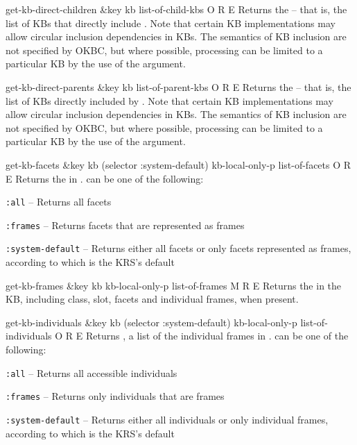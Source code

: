 \begin{okbcop}{get-kb-direct-children}{ \&key kb} { list-of-child-kbs } { O } { R } { E }
Returns the  -- that is, the list of KBs that
    directly include .  Note that certain KB implementations may
    allow circular inclusion dependencies in KBs.  The semantics of KB
    inclusion are not specified by OKBC, but where possible, processing can
    be limited to a particular KB by the use of the 
    argument.
\end{okbcop}

\begin{okbcop}{get-kb-direct-parents}{ \&key kb} { list-of-parent-kbs } { O } { R } { E }
Returns the  -- that is, the list of KBs directly
    included by .  Note that certain KB implementations may allow
    circular inclusion dependencies in KBs.  The semantics of KB inclusion
    are not specified by OKBC, but where possible, processing can be limited
    to a particular KB by the use of the  argument.
\end{okbcop}

\begin{okbcop}{get-kb-facets}{ \&key kb (selector :system-default) kb-local-only-p} { list-of-facets } { O } { R } { E }
Returns the  in .
    can be one of the following:
   \bitem
   \item {\tt :all} -- Returns all facets
   \item {\tt :frames} -- Returns facets that are represented as frames
   \item {\tt :system-default} -- Returns either all facets or
          only facets represented as frames, according to which is the KRS's
          default
   \eitem
\end{okbcop}

\begin{okbcop}{get-kb-frames}{ \&key kb kb-local-only-p} { list-of-frames } { M } { R } { E }
Returns the  in the KB, including class, slot,
   facets and individual frames, when present.
\end{okbcop}

\begin{okbcop}{get-kb-individuals}{ \&key kb (selector :system-default) kb-local-only-p} { list-of-individuals } { O } { R } { E }
Returns , a list of the individual frames in
   .   can be one of the following:
   \bitem
   \item {\tt :all} -- Returns all accessible individuals
   \item {\tt :frames} -- Returns only individuals that are frames
   \item {\tt :system-default} -- Returns either all individuals or
          only individual frames, according to which is the KRS's default
   \eitem
\end{okbcop}

